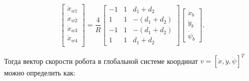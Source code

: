\documentclass[14pt, a4paper]{extreport}
\begin{document}
\begin{equation}
\begin{bmatrix}
\dot{x}_{w1}\\[1mm] \dot{x}_{w2}\\[1mm] \dot{x}_{w3}\\[1mm] \dot{x}_{w4}\\[1mm]
\end{bmatrix} = 
\frac{4}{R}
\begin{bmatrix}
-1 & 1 & d_1+d_2\\[1mm]
1 & 1 & -(d_1+d_2)\\[1mm]
-1 & 1 & -(d_1+d_2)\\[1mm]
1 & 1 & d_1+d_2
\end{bmatrix}
\begin{bmatrix}
\dot{x}_b\\[1mm] \dot{y}_b\\[1mm] \dot{\psi}_b
\end{bmatrix}\!.
\tag{41} \label{eq:41}
\end{equation}

Тогда вектор скорости робота в глобальной системе координат $v = [\dot{x}, \dot{y}, \dot{\psi}]^T$ можно определить как:
\end{document}
